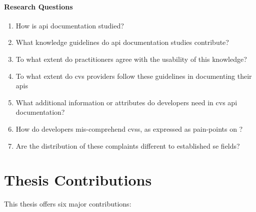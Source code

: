 \paragraph{Research Questions}
\begin{enumerate}[label=\textbf{RQ1.\arabic*.}, ref=RQ2.\arabic*, leftmargin=3.5\parindent, rightmargin=1\parindent]

  \item {} How is \gls{api} documentation studied?
  \item {} What knowledge guidelines do \gls{api} documentation studies contribute?
  \item {} To what extent do practitioners agree with the usability of this knowledge?
  \item {} To what extent do \gls{cvs} providers follow these guidelines in documenting their \glspl{api} \label{rqs:apidoc:what-is-in-use}%
  \item {} What additional information or attributes do developers need in \gls{cvs} \gls{api} documentation?
  \label{rqs:apidoc:what-additional-information-needed}%
  \item {} How do developers mis-comprehend \glspl{cvs}, as expressed as pain-points on ?%
  \item {} Are the distribution of these complaints different to established \gls{se} fields?
\end{enumerate}



\section{Thesis Contributions}

This thesis offers six major contributions:

